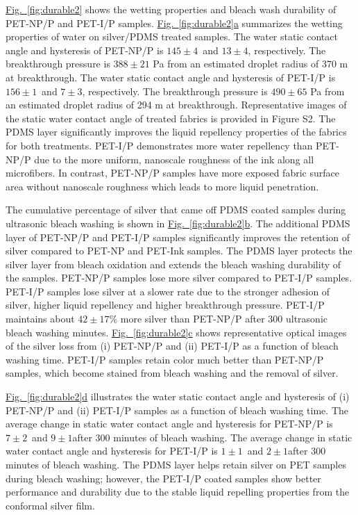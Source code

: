 \documentclass[journal=jacsat,manuscript=article]{achemso}
\newcommand{\figref}[2][]{\hyperref[#2]{Fig.~\ref{#2}#1}}
\begin{document}
\figref{fig:durable2} shows the wetting properties and bleach wash durability of PET-NP/P and PET-I/P samples. 
\figref[a]{fig:durable2} summarizes the wetting properties of water on silver/PDMS treated samples. 
The water static contact angle and hysteresis of PET-NP/P is $145 \pm 4$\degree~and $13 \pm 4$\degree, respectively. 
The breakthrough pressure is $388 \pm 21$ Pa from an estimated droplet radius of 370 \micro m at breakthrough. 
The water static contact angle and hysteresis of PET-I/P is $156 \pm 1$\degree~and $7 \pm 3$\degree, respectively. The breakthrough pressure is $490 \pm 65$ Pa from an estimated droplet radius of 294 \micro m at breakthrough. 
Representative images of the static water contact angle of treated fabrics is provided in Figure S2. 
The PDMS layer significantly improves the liquid repellency properties of the fabrics for both treatments. 
PET-I/P demonstrates more water repellency than PET-NP/P due to the more uniform, nanoscale roughness of the ink along all microfibers. 
In contrast, 
PET-NP/P %
samples 
have more exposed fabric surface area without nanoscale roughness which leads to more liquid penetration. 

The cumulative percentage of silver that came off PDMS coated samples during ultrasonic bleach washing is shown in \figref[b]{fig:durable2}. The additional PDMS layer of PET-NP/P and PET-I/P samples significantly improves the retention of silver compared to PET-NP and PET-Ink samples. The PDMS layer protects the silver layer from bleach oxidation and extends the bleach washing durability of the samples. PET-NP/P samples lose more silver compared to PET-I/P samples. PET-I/P samples lose silver at a slower rate due to the stronger adhesion of silver, higher liquid repellency and higher breakthrough pressure. PET-I/P maintains about $42 \pm 17$\% more silver than PET-NP/P after 300 ultrasonic bleach washing minutes. 
\figref[c]{fig:durable2} shows representative optical images of the silver loss from (i) PET-NP/P and (ii) PET-I/P as a function of bleach washing time.  
PET-I/P samples retain color much better than PET-NP/P samples, which become stained from bleach washing and the removal of silver.  

\figref[d]{fig:durable2} illustrates the water static contact angle and hysteresis of (i) PET-NP/P and (ii) PET-I/P samples as a function of bleach washing time. The average change in static water contact angle and hysteresis for %
PET-NP/P is $7 \pm 2$\degree~and $9 \pm 1$\degree after 300 minutes of bleach washing. 
The average change in static water contact angle and hysteresis for 
PET-I/P is $1 \pm 1$\degree~and $2 \pm 1$\degree after 300 minutes of bleach washing. 
The PDMS layer helps retain silver on PET samples during bleach washing; however, the PET-I/P coated samples show better performance and durability due to the stable liquid repelling properties from the conformal silver film. 
\end{document}

